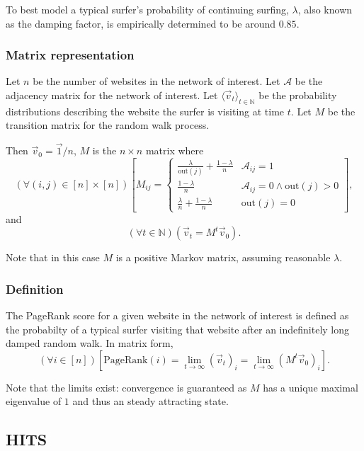 \documentclass[12pt, titlepage, twoside]{amsart}
\newcommand{\N}{\ensuremath{\mathbb N}}
\begin{document}
To best model a typical surfer's probability of continuing surfing, $\lambda$, also known as the damping factor,
is empirically determined to be around $0.85$.

\subsubsection{Matrix representation}

Let $n$ be the number of websites in the network of interest.
Let $\mathcal{A}$ be the adjacency matrix for the network of interest.
Let $\langle\vec{v}_{t}\rangle_{t\in\N}$ be the probability distributions describing the
website the surfer is visiting at time $t$.
Let $M$ be the transition matrix for the random walk process.

Then $\vec{v}_0 = \vec{1} / n$,
$M$ is the $n\times n$ matrix where
\[
  (\forall (i, j)\in[n]\times[n])
  \left[
  M_{ij} =
  \begin{cases}
    \frac{\lambda}{\mathrm{out}(j)} + \frac{1 - \lambda}{n}
    & \mathcal{A}_{ij} = 1 \\
    \frac{1 - \lambda}{n}
    & \mathcal{A}_{ij} = 0\wedge\mathrm{out}(j) > 0 \\
    \frac{\lambda}{n} + \frac{1 - \lambda}{n}
    & \mathrm{out}(j) = 0
  \end{cases}
  \right],
\]
and
\[
  (\forall t\in\N)\left(\vec{v}_t = M^t\vec{v}_0\right).
\]

Note that in this case $M$ is a positive Markov matrix, assuming reasonable $\lambda$.

\subsubsection{Definition}

The PageRank score for a given website in the network of interest is defined as the probabilty of a typical surfer
visiting that website after an indefinitely long damped random walk.
In matrix form,
\[
  (\forall i\in[n])
  \left[\mathrm{PageRank}(i) = \lim_{t\to\infty}(\vec{v}_t)_i = \lim_{t\to\infty}\left(M^t\vec{v}_0\right)_i\right].
\]

Note that the limits exist: convergence is guaranteed as $M$ has a unique maximal eigenvalue of $1$ and thus an steady
attracting state.

\subsection{HITS}
\end{document}
